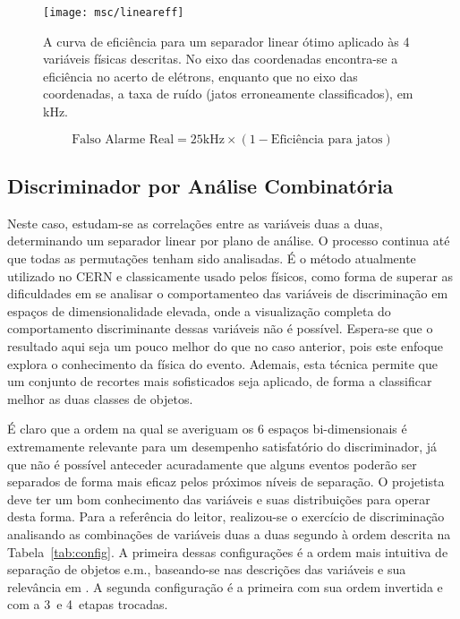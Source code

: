 \begin{figure}
\begin{center}
\texttt{[image: msc/lineareff]}
\end{center}
\caption[A curva de eficiência para um separador linear ótimo aplicado às 4
variáveis físicas descritas.]{A curva de eficiência para um separador linear
ótimo aplicado às 4 variáveis físicas descritas. No eixo das coordenadas
encontra-se a eficiência no acerto de elétrons, enquanto que no eixo das
coordenadas, a taxa de ruído (jatos erroneamente classificados), em kHz.}
\label{fig:linear}
\end{figure}

\begin{equation}
\text{Falso Alarme Real} = 25 \text{kHz} \times (1 - \text{Eficiência para
jatos})
\label{eq:noise}
\end{equation}

\subsection{Discriminador por Análise Combinatória}

Neste caso, estudam-se as correla\-çõ\-es entre as va\-ri\-á\-ve\-is duas a
duas, determinando um separador linear por plano de análise. O processo
continua até que todas as permutações tenham sido analisadas. É o método
atualmente utilizado no CERN e classicamente usado pelos físicos, como forma
de superar as dificuldades em se analisar o comportamenteo das variáveis de
discriminação em espaços de dimensionalidade elevada, onde a visualização
completa do comportamento discriminante dessas variáveis não é
possível. Espera-se que o resultado aqui seja um pouco melhor do que no caso
anterior, pois este enfoque explora o conhecimento da física do
evento. Ademais, esta técnica permite que um conjunto de recortes mais
sofisticados seja aplicado, de forma a classificar melhor as duas classes de
objetos.

É claro que a ordem na qual se averiguam os 6 espaços bi-dimensionais é
extremamente relevante para um desempenho satisfatório do discriminador, já
que não é possível anteceder acuradamente que alguns eventos poderão ser
separados de forma mais eficaz pelos próximos níveis de separação. O
projetista deve ter um bom conhecimento das variáveis e suas distribuições
para operar desta forma. Para a referência do leitor, realizou-se o exercício
de discriminação analisando as combinações de variáveis duas a duas segundo à
ordem descrita na Tabela~\ref{tab:config}. A primeira dessas configurações é a
ordem mais intuitiva de separação de objetos e.m., baseando-se nas descrições
das variáveis e sua relevância em \cite{daqnote00-02, hlt-tdr}. A segunda
configuração é a primeira com sua ordem invertida e com a 3\eira\ e 4\eira\
etapas trocadas.

